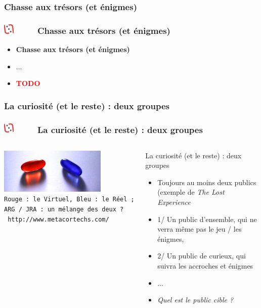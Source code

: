 \documentclass[slidetop,11pt]{beamer}
\def\moreInFrameTitleLeftt{\includegraphics[height=0.5cm]{img/ligueludique-0.png}~~~~~}
\begin{document}
\def\sectionPartIIbII{Chasse aux tr{\'e}sors (et {\'e}nigmes)}
\subsubsection{\sectionPartIIbII} %
\begin{frame}
	\frametitle{\moreInFrameTitleLeftt \sectionPartIIbII }
	\begin{itemize}
		\item \textbf{ \sectionPartIIbII }
		\item[] ...
		\item \textcolor{red}{ \textbf{TODO} }
	\end{itemize}
\end{frame} 

\def\sectionPartIIbIII{La curiosit{\'e} (et le reste) : deux groupes}
\subsubsection{\sectionPartIIbIII} %
\begin{frame}
	\frametitle{\moreInFrameTitleLeftt \sectionPartIIbIII }
	\begin{columns}[T]
		\begin{column}[T]{5.10cm}
			\includegraphics[width=5.05cm]{img/ob_0ce702_pillules.jpg}~\\
			\texttt{\footnotesize Rouge : le Virtuel, Bleu : le R{\'e}el ; ARG / JRA : un m{\'e}lange des deux ? }~\\
			\texttt{ http://www.metacortechs.com/ }
		\end{column}
		\begin{column}[T]{5.80cm}
			 \begin{beamerboxesrounded}	[lower=substructureRED, %
							 upper=block title RED,%
							 shadow=true]%
				   {\sectionPartIIbIII}
				\begin{itemize}
					\item Toujours au moins deux publics (exemple de \emph{The Lost Experience}
					\item 1/ Un public d'ensemble, qui ne verra m{\^e}me pas le jeu / les {\'e}nigmes, 
					\item 2/ Un public de curieux, qui suivra les accroches et {\'e}nigmes
					\item ...
					\item \emph{Quel est le public cible ?}
				\end{itemize}
			\end{beamerboxesrounded}
		\end{column}
	\end{columns}
\end{frame} 
\end{document}

